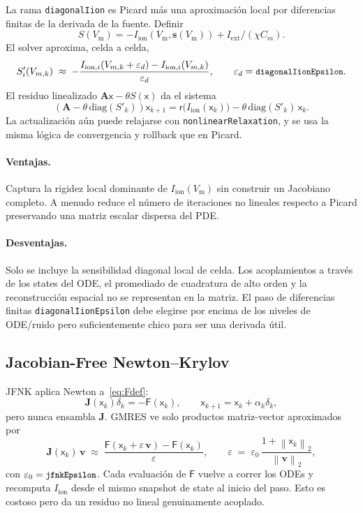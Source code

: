 \documentclass[11pt,a4paper]{article}
\newcommand{\code}[1]{\texttt{\small #1}}
\newcommand{\Vm}{V_{\text{m}}}
\newcommand{\Iion}{I_{\mathrm{ion}}}
\newcommand{\Aimp}{\mathbf{A}}
\newcommand{\Fres}{\mathsf{F}}
\newcommand{\norm}[1]{\left\lVert #1 \right\rVert}
\newcommand{\Iext}{I_{\mathrm{ext}}}
\begin{document}
La rama \code{diagonalIion} es Picard más una aproximación local por diferencias
finitas de la derivada de la fuente. Definir
\[
  S(\Vm) = -\Iion(\Vm,\mathbf{s}(\Vm)) + \Iext/(\chi C_m).
\]
El solver aproxima, celda a celda,
\begin{equation}
  S'_i(V_{m,k})
  \;\approx\;
  -\frac{
      I_{\mathrm{ion},i}(V_{m,k}+\varepsilon_d)
      - I_{\mathrm{ion},i}(V_{m,k})
    }{\varepsilon_d},
  \qquad
  \varepsilon_d=\code{diagonalIionEpsilon}.
\end{equation}
El residuo linealizado $\Aimp\mathsf{x}-\theta S(\mathsf{x})$ da el sistema
\begin{equation}
  \left(\Aimp-\theta\,\mathrm{diag}(S'_k)\right)\mathsf{x}_{k+1}
  =
  \mathsf{r}\!\bigl(\Iion(\mathsf{x}_{k})\bigr)
  - \theta\,\mathrm{diag}(S'_k)\,\mathsf{x}_{k}.
  \label{eq:diagonalIion}
\end{equation}
La actualización aún puede relajarse con \code{nonlinearRelaxation}, y se usa la
misma lógica de convergencia y rollback que en Picard.

\paragraph{Ventajas.}
Captura la rigidez local dominante de $\Iion(\Vm)$ sin construir un Jacobiano
completo. A menudo reduce el número de iteraciones no lineales respecto a Picard
preservando una matriz escalar dispersa del PDE.

\paragraph{Desventajas.}
Solo se incluye la sensibilidad diagonal local de celda. Los acoplamientos a través
de los states del ODE, el promediado de cuadratura de alto orden y la
reconstrucción espacial no se representan en la matriz. El paso de diferencias
finitas \code{diagonalIionEpsilon} debe elegirse por encima de los niveles de
ODE/ruido pero suficientemente chico para ser una derivada útil.

\subsection{Jacobian-Free Newton--Krylov}

JFNK aplica Newton a~\eqref{eq:Fdef}:
\[
  \mathbf{J}(\mathsf{x}_k)\delta_k
  =
  -\Fres(\mathsf{x}_k),
  \qquad
  \mathsf{x}_{k+1}=\mathsf{x}_k+\alpha_k\delta_k,
\]
pero nunca ensambla $\mathbf{J}$. GMRES ve solo productos matriz-vector aproximados
por
\begin{equation}
  \mathbf{J}(\mathsf{x}_{k})\, \mathbf{v}
   \;\approx\;
   \frac{\Fres(\mathsf{x}_{k} + \varepsilon\, \mathbf{v})
         - \Fres(\mathsf{x}_{k})}{\varepsilon},
   \qquad
   \varepsilon \;=\; \varepsilon_{0}\,
                     \frac{1 + \norm{\mathsf{x}_{k}}_{2}}
                          {\norm{\mathbf{v}}_{2}},
   \label{eq:fdjac}
\end{equation}
con $\varepsilon_{0}=\code{jfnkEpsilon}$. Cada evaluación de $\Fres$ vuelve a
correr los ODEs y recomputa $\Iion$ desde el mismo snapshot de state al inicio del
paso. Esto es costoso pero da un residuo no lineal genuinamente acoplado.
\end{document}

